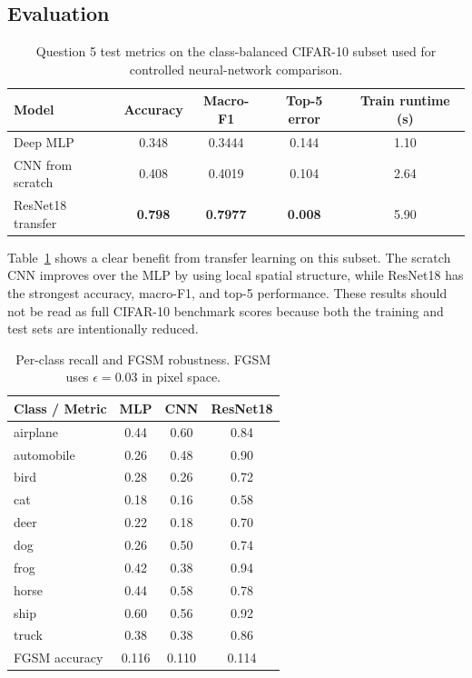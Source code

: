 \subsection{Evaluation}

\begin{table}[htbp]
\centering
\caption{Question 5 test metrics on the class-balanced CIFAR-10 subset used for controlled neural-network comparison.}
\label{tab:q5_metrics}
\begin{tabular}{lcccc}
\toprule
Model & Accuracy & Macro-F1 & Top-5 error & Train runtime (s) \\
\midrule
Deep MLP & 0.348 & 0.3444 & 0.144 & 1.10 \\
CNN from scratch & 0.408 & 0.4019 & 0.104 & 2.64 \\
ResNet18 transfer & \textbf{0.798} & \textbf{0.7977} & \textbf{0.008} & 5.90 \\
\bottomrule
\end{tabular}
\end{table}

Table~\ref{tab:q5_metrics} shows a clear benefit from transfer learning on this subset. The scratch CNN improves over the MLP by using local spatial structure, while ResNet18 has the strongest accuracy, macro-F1, and top-5 performance. These results should not be read as full CIFAR-10 benchmark scores because both the training and test sets are intentionally reduced.

\begin{table}[htbp]
\centering
\caption{Per-class recall and FGSM robustness. FGSM uses $\epsilon=0.03$ in pixel space.}
\label{tab:q5_recall_fgsm}
\begin{tabular}{lccc}
\toprule
Class / Metric & MLP & CNN & ResNet18 \\
\midrule
airplane & 0.44 & 0.60 & 0.84 \\
automobile & 0.26 & 0.48 & 0.90 \\
bird & 0.28 & 0.26 & 0.72 \\
cat & 0.18 & 0.16 & 0.58 \\
deer & 0.22 & 0.18 & 0.70 \\
dog & 0.26 & 0.50 & 0.74 \\
frog & 0.42 & 0.38 & 0.94 \\
horse & 0.44 & 0.58 & 0.78 \\
ship & 0.60 & 0.56 & 0.92 \\
truck & 0.38 & 0.38 & 0.86 \\
\midrule
FGSM accuracy & 0.116 & 0.110 & 0.114 \\
\bottomrule
\end{tabular}
\end{table}

